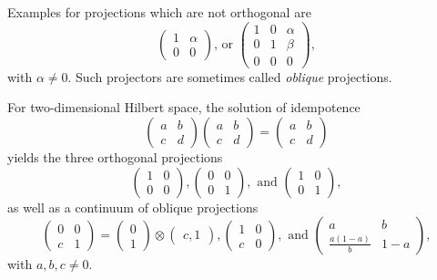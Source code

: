 {\color{blue}
\bexample

Examples for projections which are not orthogonal are
$$\begin{pmatrix}
1&\alpha \\
0&0
\end{pmatrix}
\text{,  or }
\begin{pmatrix}
1&0&\alpha \\
0&1&\beta \\
0&0&0
\end{pmatrix},$$
with $\alpha \neq 0$.
Such projectors are sometimes called
{\em oblique} projections.



For two-dimensional Hilbert space, the solution
of idempotence
$$
\begin{pmatrix}
a&b \\
c&d
\end{pmatrix}
\begin{pmatrix}
a&b \\
c&d
\end{pmatrix}
=
\begin{pmatrix}
a&b \\
c&d
\end{pmatrix}
$$
yields the three orthogonal projections
$$
\begin{pmatrix}
1&0 \\
0&0
\end{pmatrix},
\begin{pmatrix}
0&0 \\
0&1
\end{pmatrix},\text{ and }
\begin{pmatrix}
1&0 \\
0&1
\end{pmatrix},
$$
as well as a continuum of oblique projections
$$
\begin{pmatrix}
0&0 \\
c&1
\end{pmatrix}
=
\begin{pmatrix}
0 \\
1
\end{pmatrix}
\otimes
\begin{pmatrix}
c,1
\end{pmatrix},
\begin{pmatrix}
1&0 \\
c&0
\end{pmatrix},\text{ and }
\begin{pmatrix}
a&b \\
\frac{a(1-a)}{b}&1-a
\end{pmatrix},
$$
with $a,b,c \neq 0$.

}
